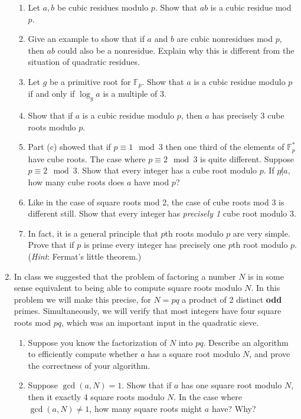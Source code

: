 \documentclass[11pt]{article}
\newcommand{\bF}{\mathbb{F}}
\begin{document}
\begin{enumerate}
{  \begin{enumerate}
    \item{
    Let $a,b$ be cubic residues modulo $p$.  Show that $ab$ is a cubic residue mod $p$.
    }
    \item{
    Give an example to show that if $a$ and $b$ are cubic nonresidues mod $p$, then $ab$ could also be a nonresidue.  Explain why this is different from the situation of quadratic residues.
    }
    \item{
    Let $g$ be a primitive root for $\bF_p$.  Show that $a$ is a cubic residue modulo $p$ if and only if $\log_g a$ is a multiple of 3.
    }
    \item{
    Show that if $a$ is a cubic residue modulo $p$, then $a$ has precisely 3 cube roots modulo $p$.
    }
    \item{
    Part (c) showed that if $p\equiv 1\mod 3$ then one third of the elements of $\bF_p^*$ have cube roots.  The case where $p\equiv 2\mod 3$ is quite different.  Suppose $p\equiv 2\mod 3$.  Show that every integer has a cube root modulo $p$.  If $p\not|a$, how many cube roots does $a$ have mod $p$?
    }
    \item{
    Like in the case of square roots mod 2, the case of cube roots mod 3 is different still.  Show that every integer has \textit{precisely 1} cube root modulo 3.
    }
    \item{
    In fact, it is a general principle that $p$th roots modulo $p$ are very simple.  Prove that if $p$ is prime every integer has precisely one $p$th root modulo $p$.  (\textit{Hint}: Fermat's little theorem.)
    }
  \end{enumerate}
  }
  \item{
  In class we suggested that the problem of factoring a number $N$ is in some sense equivalent to being able to compute square roots modulo $N$.  In this problem we will make this precise, for $N=pq$ a product of 2 distinct \textbf{odd} primes.  Simultaneously, we will verify that most integers have four square roots mod $pq$, which was an important input in the quadratic sieve.
  \begin{enumerate}
    \item{
    Suppose you know the factorization of $N$ into $pq$.  Describe an algorithm to efficiently compute whether $a$ has a square root modulo $N$, and prove the correctness of your algorithm.
    }
    \item{
    Suppose $\gcd(a,N)=1$.  Show that if $a$ has one square root modulo $N$, then it exactly 4 square roots modulo $N$.  In the case where $\gcd(a,N)\not=1$, how many square roots might $a$ have? Why?
}
\end{enumerate}}
\end{enumerate}
\end{document}
